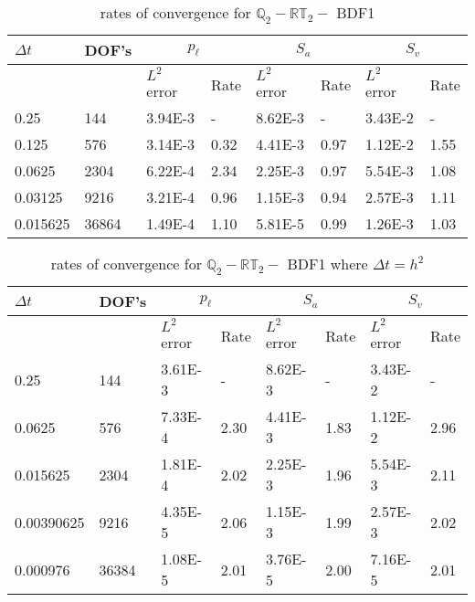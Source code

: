 \begin{table}[ht]
	\centering
	\begin{tabular}{|l|l|l||l|l||l|l|l|}
		\hline
		$\Delta t$ & DOF's & \multicolumn{2}{c|}{$p_{\ell}$} & \multicolumn{2}{c|}{$S_a$} & \multicolumn{2}{c|}{$S_v$}  \\ \hline
		& & $L^2$ error & Rate & $L^2$ error & Rate & $L^2$ error & Rate \\ \hline
		0.25   	  & 144   & 3.94E-3 & -	   & 8.62E-3 & -    & 3.43E-2 & - \\ \hline
		0.125     & 576   & 3.14E-3 & 0.32 & 4.41E-3 & 0.97 & 1.12E-2 & 1.55 \\ \hline
		0.0625    & 2304  & 6.22E-4 & 2.34 & 2.25E-3 & 0.97 & 5.54E-3 & 1.08 \\ \hline
		0.03125   & 9216  & 3.21E-4 & 0.96 & 1.15E-3 & 0.94 & 2.57E-3 & 1.11 \\ \hline 
		0.015625  & 36864 & 1.49E-4 & 1.10 & 5.81E-5 & 0.99 & 1.26E-3 & 1.03  \\ \hline
	\end{tabular}
	\caption[Template table-description for list of tables.]{ rates of convergence for $\mathbb{Q}_2 - \mathbb{RT}_2 -$ BDF1}
\end{table}

\begin{table}[ht]
	\centering
	\begin{tabular}{|l|l|l||l|l||l|l|l|}
		\hline
		$\Delta t$ & DOF's & \multicolumn{2}{c|}{$p_{\ell}$} & \multicolumn{2}{c|}{$S_a$} & \multicolumn{2}{c|}{$S_v$}  \\ \hline
		& & $L^2$ error & Rate & $L^2$ error & Rate & $L^2$ error & Rate \\ \hline
		0.25   	  & 144   & 3.61E-3 & -	   & 8.62E-3 & -    & 3.43E-2 & - \\ \hline
		0.0625    & 576   & 7.33E-4 & 2.30 & 4.41E-3 & 1.83 & 1.12E-2 & 2.96 \\ \hline
		0.015625  & 2304  & 1.81E-4 & 2.02 & 2.25E-3 & 1.96 & 5.54E-3 & 2.11 \\ \hline
		0.00390625& 9216  & 4.35E-5 & 2.06 & 1.15E-3 & 1.99 & 2.57E-3 & 2.02 \\ \hline 
		0.000976  & 36384 & 1.08E-5 & 2.01 & 3.76E-5 & 2.00 & 7.16E-5 & 2.01  \\ \hline
	\end{tabular}
	\caption[Template table-description for list of tables.]{ rates of convergence for $\mathbb{Q}_2 - \mathbb{RT}_2 -$ BDF1 where $\Delta t = h^2$ }
\end{table}

